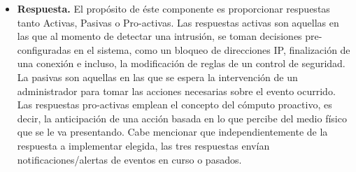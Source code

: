 \begin{itemize}
	\item \textbf{Respuesta.} El propósito de éste componente es proporcionar respuestas tanto Activas, Pasivas o Pro-activas. Las respuestas activas son aquellas en las que al momento de detectar una intrusión, se toman decisiones pre-configuradas en el sistema, como un bloqueo de direcciones IP, finalización de una conexión e incluso, la modificación de reglas de un control de seguridad. La pasivas son aquellas en las que se espera la intervención de un administrador para tomar las acciones necesarias sobre el evento ocurrido. Las respuestas pro-activas emplean el concepto del cómputo proactivo, es decir, la anticipación de una acción basada en lo que percibe del medio físico que se le va presentando. Cabe mencionar que independientemente de la respuesta a implementar elegida, las tres respuestas envían notificaciones/alertas de eventos en curso o pasados.
	
\end{itemize}